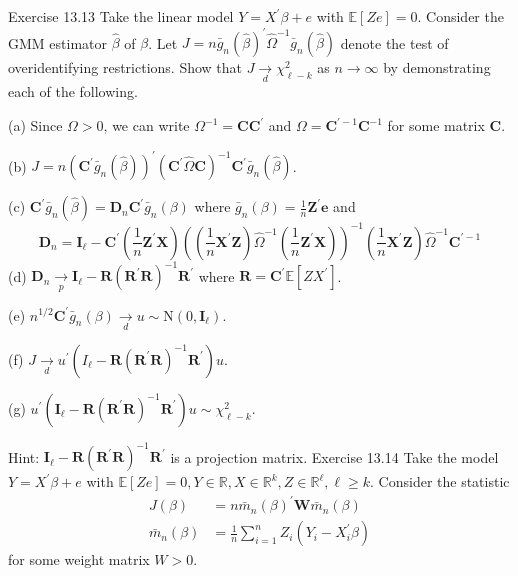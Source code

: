 \documentclass[10pt]{article}
\begin{document}
Exercise 13.13 Take the linear model $Y=X^{\prime} \beta+e$ with $\mathbb{E}[Z e]=0$. Consider the GMM estimator $\widehat{\beta}$ of $\beta$. Let $J=n \bar{g}_{n}(\widehat{\beta})^{\prime} \widehat{\Omega}^{-1} \bar{g}_{n}(\widehat{\beta})$ denote the test of overidentifying restrictions. Show that $J \underset{d}{\longrightarrow} \chi_{\ell-k}^{2}$ as $n \rightarrow \infty$ by demonstrating each of the following.

(a) Since $\Omega>0$, we can write $\Omega^{-1}=\boldsymbol{C} \boldsymbol{C}^{\prime}$ and $\Omega=\boldsymbol{C}^{\prime-1} \boldsymbol{C}^{-1}$ for some matrix $\boldsymbol{C}$.

(b) $J=n\left(\boldsymbol{C}^{\prime} \bar{g}_{n}(\widehat{\beta})\right)^{\prime}\left(\boldsymbol{C}^{\prime} \widehat{\Omega} \boldsymbol{C}\right)^{-1} \boldsymbol{C}^{\prime} \bar{g}_{n}(\widehat{\beta})$.

(c) $\boldsymbol{C}^{\prime} \bar{g}_{n}(\widehat{\beta})=\boldsymbol{D}_{n} \boldsymbol{C}^{\prime} \bar{g}_{n}(\beta)$ where $\bar{g}_{n}(\beta)=\frac{1}{n} \boldsymbol{Z}^{\prime} \boldsymbol{e}$ and
$$
\boldsymbol{D}_{n}=\boldsymbol{I}_{\ell}-\boldsymbol{C}^{\prime}\left(\frac{1}{n} \boldsymbol{Z}^{\prime} \boldsymbol{X}\right)\left(\left(\frac{1}{n} \boldsymbol{X}^{\prime} \boldsymbol{Z}\right) \widehat{\Omega}^{-1}\left(\frac{1}{n} \boldsymbol{Z}^{\prime} \boldsymbol{X}\right)\right)^{-1}\left(\frac{1}{n} \boldsymbol{X}^{\prime} \boldsymbol{Z}\right) \widehat{\Omega}^{-1} \boldsymbol{C}^{\prime-1}
$$
(d) $\boldsymbol{D}_{n} \underset{p}{\longrightarrow} \boldsymbol{I}_{\ell}-\boldsymbol{R}\left(\boldsymbol{R}^{\prime} \boldsymbol{R}\right)^{-1} \boldsymbol{R}^{\prime}$ where $\boldsymbol{R}=\boldsymbol{C}^{\prime} \mathbb{E}\left[Z X^{\prime}\right]$.

(e) $n^{1 / 2} \boldsymbol{C}^{\prime} \bar{g}_{n}(\beta) \underset{d}{\longrightarrow} u \sim \mathrm{N}\left(0, \boldsymbol{I}_{\ell}\right)$.

(f) $J \underset{d}{\longrightarrow} u^{\prime}\left(I_{\ell}-\boldsymbol{R}\left(\boldsymbol{R}^{\prime} \boldsymbol{R}\right)^{-1} \boldsymbol{R}^{\prime}\right) u$.

(g) $u^{\prime}\left(\boldsymbol{I}_{\ell}-\boldsymbol{R}\left(\boldsymbol{R}^{\prime} \boldsymbol{R}\right)^{-1} \boldsymbol{R}^{\prime}\right) u \sim \chi_{\ell-k}^{2}$.

Hint: $\boldsymbol{I}_{\ell}-\boldsymbol{R}\left(\boldsymbol{R}^{\prime} \boldsymbol{R}\right)^{-1} \boldsymbol{R}^{\prime}$ is a projection matrix. Exercise 13.14 Take the model $Y=X^{\prime} \beta+e$ with $\mathbb{E}[Z e]=0, Y \in \mathbb{R}, X \in \mathbb{R}^{k}, Z \in \mathbb{R}^{\ell}, \ell \geq k$. Consider the statistic
$$
\begin{aligned}
J(\beta) &=n \bar{m}_{n}(\beta)^{\prime} \boldsymbol{W} \bar{m}_{n}(\beta) \\
\bar{m}_{n}(\beta) &=\frac{1}{n} \sum_{i=1}^{n} Z_{i}\left(Y_{i}-X_{i}^{\prime} \beta\right)
\end{aligned}
$$
for some weight matrix $W>0$.
\end{document}
